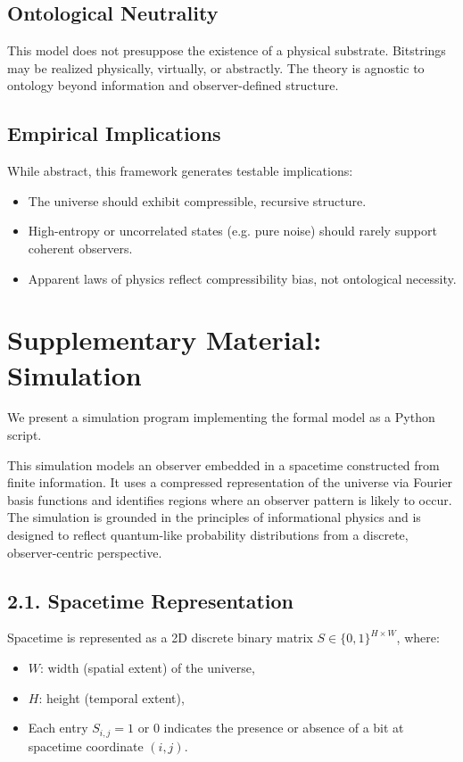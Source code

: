 \documentclass[11pt]{article}
\begin{document}
\subsection{Ontological Neutrality}

This model does not presuppose the existence of a physical substrate. Bitstrings may be realized physically, virtually, or abstractly. The theory is agnostic to ontology beyond information and observer-defined structure.

\subsection{Empirical Implications}

While abstract, this framework generates testable implications:

\begin{itemize}
    \item The universe should exhibit compressible, recursive structure.
    \item High-entropy or uncorrelated states (e.g. pure noise) should rarely support coherent observers.
    \item Apparent laws of physics reflect compressibility bias, not ontological necessity.
\end{itemize}



\section{Supplementary Material: Simulation}

We present a simulation program implementing the formal model as a Python script.

This simulation models an observer embedded in a spacetime constructed from finite information. It uses a compressed representation of the universe via Fourier basis functions and identifies regions where an observer pattern is likely to occur. The simulation is grounded in the principles of informational physics and is designed to reflect quantum-like probability distributions from a discrete, observer-centric perspective.

\subsection*{2.1. Spacetime Representation}

Spacetime is represented as a 2D discrete binary matrix $S \in \{0, 1\}^{H \times W}$, where:
\begin{itemize}
    \item $W$: width (spatial extent) of the universe,
    \item $H$: height (temporal extent),
    \item Each entry $S_{i,j} = 1$ or $0$ indicates the presence or absence of a bit at spacetime coordinate $(i,j)$.
\end{itemize}
\end{document}
